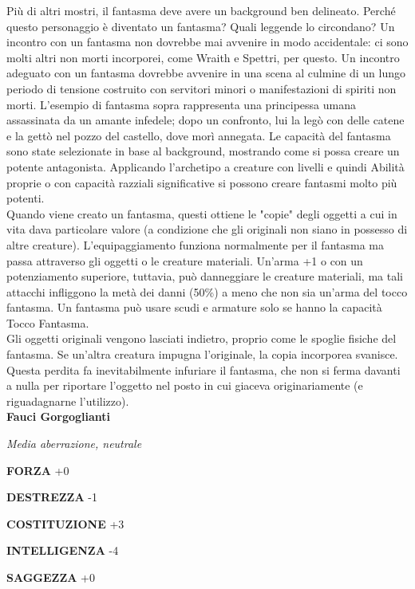 \begin{multicols}{2}
Più di altri mostri, il fantasma deve avere un background ben delineato. Perché questo personaggio è diventato un fantasma? Quali leggende lo circondano? Un incontro con un fantasma non dovrebbe mai avvenire in modo accidentale: ci sono molti altri non morti incorporei, come Wraith e Spettri, per questo. Un incontro adeguato con un fantasma dovrebbe avvenire in una scena al culmine di un lungo periodo di tensione costruito con servitori minori o manifestazioni di spiriti non morti. L'esempio di fantasma sopra rappresenta una principessa umana assassinata da un amante infedele; dopo un confronto, lui la legò con delle catene e la gettò nel pozzo del castello, dove morì annegata. Le capacità del fantasma sono state selezionate in base al background, mostrando come si possa creare un potente antagonista. Applicando l'archetipo a creature con livelli e quindi Abilità proprie o con capacità razziali significative si possono creare fantasmi molto più potenti.\\

Quando viene creato un fantasma, questi ottiene le "copie" degli oggetti a cui in vita dava particolare valore (a condizione che gli originali non siano in possesso di altre creature). L'equipaggiamento funziona normalmente per il fantasma ma passa attraverso gli oggetti o le creature materiali. Un'arma +1 o con un potenziamento superiore, tuttavia, può danneggiare le creature materiali, ma tali attacchi infliggono la metà dei danni (50\%) a meno che non sia un'arma del tocco fantasma. Un fantasma può usare scudi e armature solo se hanno la capacità Tocco Fantasma.\\

Gli oggetti originali vengono lasciati indietro, proprio come le spoglie fisiche del fantasma. Se un'altra creatura impugna l'originale, la copia incorporea svanisce. Questa perdita fa inevitabilmente infuriare il fantasma, che non si ferma davanti a nulla per riportare l'oggetto nel posto in cui giaceva originariamente (e riguadagnarne l'utilizzo).\\


\medskip{}\textbf{Fauci Gorgoglianti}

\emph{Media aberrazione, neutrale}

\textbf{FORZA} +0

\textbf{DESTREZZA} -1

\textbf{COSTITUZIONE} +3

\textbf{INTELLIGENZA} -4

\textbf{SAGGEZZA} +0


\end{multicols}

